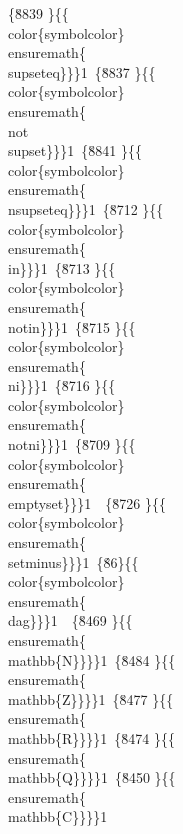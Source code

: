 {\{\u8839 \}\{\{\\color\{symbolcolor\}\\ensuremath\{\\supseteq\}\}\}1\
\{\u8837 \}\{\{\\color\{symbolcolor\}\\ensuremath\{\\not\\supset\}\}\}1\
\{\u8841 \}\{\{\\color\{symbolcolor\}\\ensuremath\{\\nsupseteq\}\}\}1\
\{\u8712 \}\{\{\\color\{symbolcolor\}\\ensuremath\{\\in\}\}\}1\
\{\u8713 \}\{\{\\color\{symbolcolor\}\\ensuremath\{\\notin\}\}\}1\
\{\u8715 \}\{\{\\color\{symbolcolor\}\\ensuremath\{\\ni\}\}\}1\
\{\u8716 \}\{\{\\color\{symbolcolor\}\\ensuremath\{\\notni\}\}\}1\
\{\u8709 \}\{\{\\color\{symbolcolor\}\\ensuremath\{\\emptyset\}\}\}1\
\
\{\u8726 \}\{\{\\color\{symbolcolor\}\\ensuremath\{\\setminus\}\}\}1\
\{\'86\}\{\{\\color\{symbolcolor\}\\ensuremath\{\\dag\}\}\}1\
\
\{\u8469 \}\{\{\\ensuremath\{\\mathbb\{N\}\}\}\}1\
\{\u8484 \}\{\{\\ensuremath\{\\mathbb\{Z\}\}\}\}1\
\{\u8477 \}\{\{\\ensuremath\{\\mathbb\{R\}\}\}\}1\
\{\u8474 \}\{\{\\ensuremath\{\\mathbb\{Q\}\}\}\}1\
\{\u8450 \}\{\{\\ensuremath\{\\mathbb\{C\}\}\}\}1\
}
